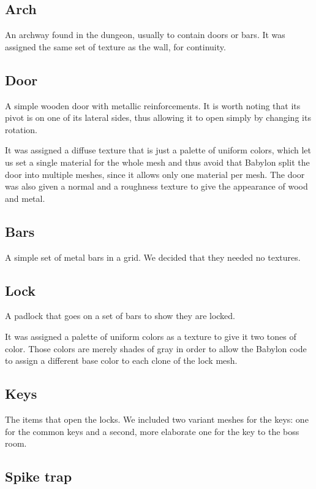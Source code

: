\subsection{Arch}

An archway found in the dungeon, usually to contain doors or bars. It was assigned the same set of texture as the wall, for continuity.

\subsection{Door}

A simple wooden door with metallic reinforcements. It is worth noting that its pivot is on one of its lateral sides, thus allowing it to open simply by changing its rotation.

It was assigned a diffuse texture that is just a palette of uniform colors, which let us set a single material for the whole mesh and thus avoid that Babylon split the door into multiple meshes, since it allows only one material per mesh. The door was also given a normal and a roughness texture to give the appearance of wood and metal.

\subsection{Bars}

A simple set of metal bars in a grid. We decided that they needed no textures.

\subsection{Lock}

A padlock that goes on a set of bars to show they are locked.

It was assigned a palette of uniform colors as a texture to give it two tones of color. Those colors are merely shades of gray in order to allow the Babylon code to assign a different base color to each clone of the lock mesh.

\subsection{Keys}

The items that open the locks. We included two variant meshes for the keys: one for the common keys and a second, more elaborate one for the key to the boss room.

\subsection{Spike trap}

